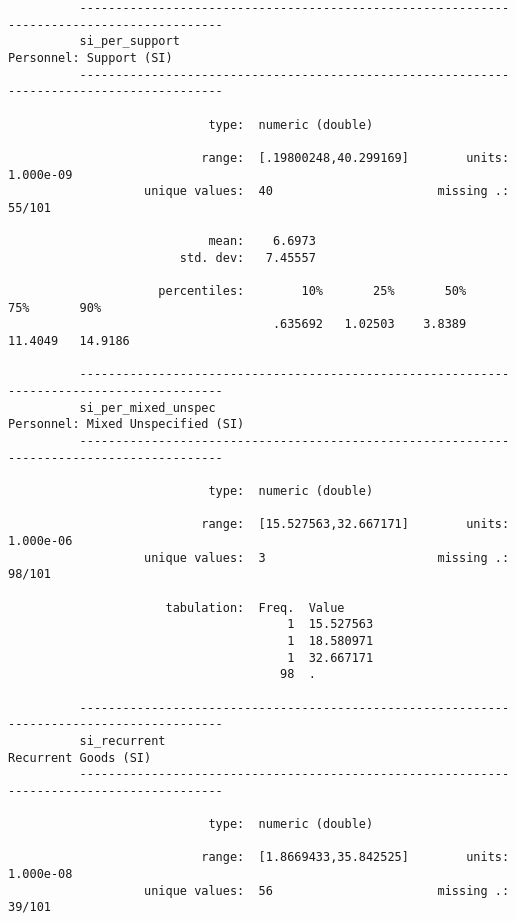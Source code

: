 \documentclass{article}
\begin{document}
\begin{verbatim}
          ------------------------------------------------------------------------------------------
          si_per_support                                                     Personnel: Support (SI)
          ------------------------------------------------------------------------------------------
          
                            type:  numeric (double)
          
                           range:  [.19800248,40.299169]        units:  1.000e-09
                   unique values:  40                       missing .:  55/101
          
                            mean:    6.6973
                        std. dev:   7.45557
          
                     percentiles:        10%       25%       50%       75%       90%
                                     .635692   1.02503    3.8389   11.4049   14.9186
          
          ------------------------------------------------------------------------------------------
          si_per_mixed_unspec                                      Personnel: Mixed Unspecified (SI)
          ------------------------------------------------------------------------------------------
          
                            type:  numeric (double)
          
                           range:  [15.527563,32.667171]        units:  1.000e-06
                   unique values:  3                        missing .:  98/101
          
                      tabulation:  Freq.  Value
                                       1  15.527563
                                       1  18.580971
                                       1  32.667171
                                      98  .
          
          ------------------------------------------------------------------------------------------
          si_recurrent                                                          Recurrent Goods (SI)
          ------------------------------------------------------------------------------------------
          
                            type:  numeric (double)
          
                           range:  [1.8669433,35.842525]        units:  1.000e-08
                   unique values:  56                       missing .:  39/101
          

\end{verbatim}
\end{document}
